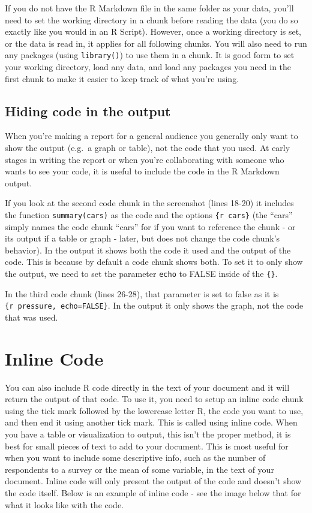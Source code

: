 \documentclass[
]{krantz}
\begin{document}
If you do not have the R Markdown file in the same folder as
your data, you'll need to set the working directory in a
chunk before reading the data (you do so exactly like you
would in an R Script). However, once a working directory is
set, or the data is read in, it applies for all following
chunks. You will also need to run any packages (using
\texttt{library()}) to use them in a chunk. It is good form
to set your working directory, load any data, and load any
packages you need in the first chunk to make it easier to
keep track of what you're using.

\hypertarget{hiding-code-in-the-output}{%
\subsection{Hiding code in the
output}\label{hiding-code-in-the-output}}

When you're making a report for a general audience you
generally only want to show the output (e.g.~a graph or
table), not the code that you used. At early stages in
writing the report or when you're collaborating with someone
who wants to see your code, it is useful to include the code
in the R Markdown output.

If you look at the second code chunk in the screenshot
(lines 18-20) it includes the function
\texttt{summary(cars)} as the code and the options
\texttt{\{r\ cars\}} (the ``cars'' simply names the code
chunk ``cars'' for if you want to reference the chunk - or
its output if a table or graph - later, but does not change
the code chunk's behavior). In the output it shows both the
code it used and the output of the code. This is because by
default a code chunk shows both. To set it to only show the
output, we need to set the parameter \texttt{echo} to FALSE
inside of the \texttt{\{\}}.

In the third code chunk (lines 26-28), that parameter is set
to false as it is \texttt{\{r\ pressure,\ echo=FALSE\}}. In
the output it only shows the graph, not the code that was
used.

\hypertarget{inline-code}{%
\section{Inline Code}\label{inline-code}}

You can also include R code directly in the text of your
document and it will return the output of that code. To use
it, you need to setup an inline code chunk using the tick
mark followed by the lowercase letter R, the code you want
to use, and then end it using another tick mark. This is
called using inline code. When you have a table or
visualization to output, this isn't the proper method, it is
best for small pieces of text to add to your document. This
is most useful for when you want to include some descriptive
info, such as the number of respondents to a survey or the
mean of some variable, in the text of your document. Inline
code will only present the output of the code and doesn't
show the code itself. Below is an example of inline code -
see the image below that for what it looks like with the
code.
\end{document}
